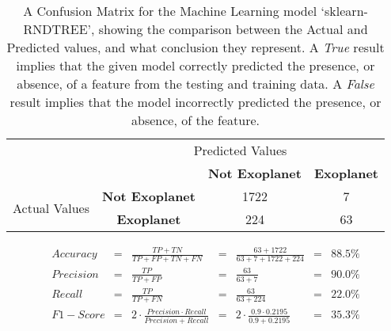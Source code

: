 
    \renewcommand{\arraystretch}{2}
    \renewcommand{\tabcolsep}{20.25pt}
    \vspace{-0.5cm}
    \begin{table}[ht]
    \begin{tabular}{cccc}
     & \multicolumn{3}{c}{Predicted Values} \\ \cline{3-4}
     & \multicolumn{1}{c|}{} & \multicolumn{1}{c|}{\textbf{Not Exoplanet}} & \multicolumn{1}{c|}{\textbf{Exoplanet}} \\ \cline{2-4}
    \multicolumn{1}{c|}{\multirow{2}{2.0cm}{Actual Values}} & \multicolumn{1}{c|}{\textbf{Not Exoplanet}} & \multicolumn{1}{c|}{1722} & \multicolumn{1}{c|}{7} \\ \cline{2-4}
    \multicolumn{1}{c|}{} & \multicolumn{1}{c|}{\textbf{Exoplanet}} & \multicolumn{1}{c|}{224} & \multicolumn{1}{c|}{63} \\ \cline{2-4}
    \end{tabular}
    \caption{A Confusion Matrix for the Machine Learning model `sklearn-RNDTREE', showing the comparison between the Actual and Predicted values, and what conclusion they represent. A \emph{True} result implies that the given model correctly predicted the presence, or absence, of a feature from the testing and training data. A \emph{False} result implies that the model incorrectly predicted the presence, or absence, of the feature.}
    \label{tab:sklearn-RNDTREEconfusionmatrix}
    \end{table}
    \vspace{-0.75cm}
    \label{eq:metrics-sklearn-RNDTREE}
    \begin{align*}
        Accuracy &= &\frac{TP + TN}{TP + FP + TN + FN} &= &\frac{63 + 1722}{63 + 7 + 1722 + 224} &= & 88.5\% \\
        Precision &= &\frac{TP}{TP + FP} &= &\frac{63}{63 + 7} &= & 90.0\% \\
        Recall &= &\frac{TP}{TP + FN} &= &\frac{63}{63 + 224} &= & 22.0\% \\
        F1-Score &= &2 \cdot \frac{Precision \cdot Recall}{Precision + Recall} &= &2 \cdot \frac{0.9 \cdot 0.2195}{0.9 + 0.2195} &= & 35.3\% \\
    \end{align*}
    \vspace{-1.75cm}
    \renewcommand{\arraystretch}{1}
    \renewcommand{\tabcolsep}{5.25pt}
    